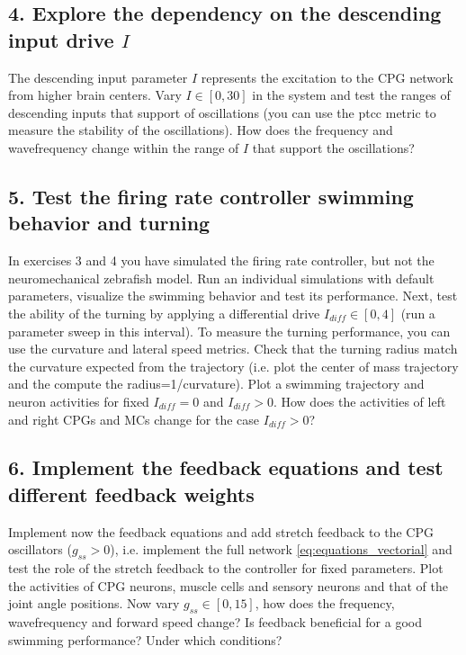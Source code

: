 \documentclass{cmc}
\begin{document}



\subsection*{4. Explore the dependency on the descending input drive $I$}\label{sec:ex4}
The descending input parameter $I$ represents the excitation to the CPG network from higher brain centers. Vary $I \in \left[0,30 \right]$ in the system and test the ranges of descending inputs that support of oscillations (you can use the ptcc metric to measure the stability of the oscillations). How does the frequency and wavefrequency change within the range of $I$ that support the oscillations?







\subsection*{5. Test the firing rate controller swimming behavior and turning}\label{sec:ex5}
In exercises 3 and 4 you have simulated the firing rate controller, but not the neuromechanical zebrafish model. Run an individual simulations with default parameters, visualize the swimming behavior and test its performance. Next, test the ability of the turning by applying a differential drive $I_{diff} \in \left[ 0,4 \right]$ (run a parameter sweep in this interval). To measure the turning performance, you can use the curvature and lateral speed metrics. Check that the turning radius match the curvature expected from the trajectory (i.e. plot the center of mass trajectory and the compute the radius=1/curvature). Plot a swimming trajectory and neuron activities for fixed $I_{diff}=0$ and $I_{diff}>0$. How does the activities of left and right CPGs and MCs change for the case $I_{diff}>0$?





\subsection*{6. Implement the feedback equations and test different feedback weights}\label{sec:ex6}
Implement now the feedback equations and add stretch feedback to the CPG oscillators ($g_{ss} > 0$), i.e. implement the full network \ref{eq:equations_vectorial} and test the role of the stretch feedback to the controller for fixed parameters. Plot the activities of CPG neurons, muscle cells and sensory neurons and that of the joint angle positions. Now vary $g_{ss} \in \left[0,15 \right]$, how does the frequency, wavefrequency and forward speed change? Is feedback beneficial for a good swimming performance? Under which conditions?
\end{document}
